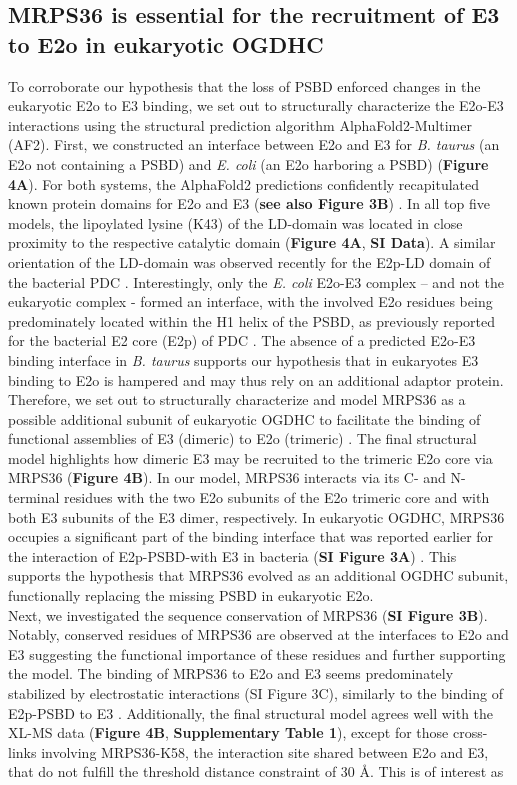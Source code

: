 \documentclass[times, twoside]{zHenriquesLab-StyleBioRxiv}
\begin{document}
\subsection*{MRPS36 is essential for the recruitment of E3 to E2o in eukaryotic OGDHC}
To corroborate our hypothesis that the loss of PSBD enforced changes in the eukaryotic E2o to E3 binding, we set out to structurally characterize the E2o-E3 interactions using the structural prediction algorithm AlphaFold2-Multimer \cite{Evans_2022} (AF2). First, we constructed an interface between E2o and E3 for \emph{B. taurus} (an E2o not containing a PSBD) and \emph{E. coli} (an E2o harboring a PSBD) (\textbf{Figure 4A}). For both systems, the AlphaFold2 predictions confidently recapitulated known protein domains for E2o and E3 (\textbf{see also Figure 3B}) \cite{Brautigam_2005, Nagy_2021}. In all top five models, the lipoylated lysine (K43) of the LD-domain was located in close proximity to the respective catalytic domain (\textbf{Figure 4A}, \textbf{SI Data}). A similar orientation of the LD-domain was observed recently for the E2p-LD domain of the bacterial PDC \cite{Skerlova_2021}. Interestingly, only the \emph{E. coli} E2o-E3 complex – and not the eukaryotic complex - formed an interface, with the involved E2o residues being predominately located within the H1 helix of the PSBD, as previously reported for the bacterial E2 core (E2p) of PDC \cite{Mande_1996}. The absence of a predicted E2o-E3 binding interface in \emph{B. taurus} supports our hypothesis that in eukaryotes E3 binding to E2o is hampered and may thus rely on an additional adaptor protein. Therefore, we set out to structurally characterize and model MRPS36 as a possible additional subunit of eukaryotic OGDHC to facilitate the binding of functional assemblies of E3 (dimeric) to E2o (trimeric) \cite{Liu_2022, Murphy_2005, Nagy_2021}. The final structural model highlights how dimeric E3 may be recruited to the trimeric E2o core via MRPS36 (\textbf{Figure 4B}). In our model, MRPS36 interacts via its C- and N-terminal residues with the two E2o subunits of the E2o trimeric core and with both E3 subunits of the E3 dimer, respectively. In eukaryotic OGDHC, MRPS36 occupies a significant part of the binding interface that was reported earlier for the interaction of E2p-PSBD-with E3 in bacteria (\textbf{SI Figure 3A}) \cite{Mande_1996}. This supports the hypothesis that MRPS36 evolved as an additional OGDHC subunit, functionally replacing the missing PSBD in eukaryotic E2o.\\ Next, we investigated the sequence conservation of MRPS36 (\textbf{SI Figure 3B}). Notably, conserved residues of MRPS36 are observed at the interfaces to E2o and E3 suggesting the functional importance of these residues and further supporting the model. The binding of MRPS36 to E2o and E3 seems predominately stabilized by electrostatic interactions (SI Figure 3C), similarly to the binding of E2p-PSBD to E3 \cite{Mande_1996}. Additionally, the final structural model agrees well with the XL-MS data (\textbf{Figure 4B}, \textbf{Supplementary Table 1}), except for those cross-links involving MRPS36-K58, the interaction site shared between E2o and E3, that do not fulfill the threshold distance constraint of 30 Å. This is of interest as 
\end{document}
